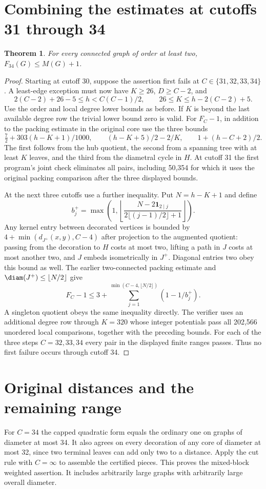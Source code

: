 \documentclass[11pt,a4paper]{article}
\newtheorem{theorem}{Theorem}[section]
\begin{document}
\section{Combining the estimates at cutoffs 31 through 34}
\begin{theorem}
For every connected graph of order at least two, $F_{34}(G)\le M(G)+1$.
\end{theorem}
\begin{proof}
Starting at cutoff 30, suppose the assertion first fails at $C\in\{31,32,33,34\}$. A least-edge exception must now have $K\ge26$, $D\ge C-2$, and
\[
2(C-2)+26-5\le h<C(C-1)/2,\qquad 26\le K\le h-2(C-2)+5 .
\]
Use the order and local degree lower bounds as before. If $K$ is beyond the last available degree row the trivial lower bound zero is valid. For $F_C-1$, in addition to the packing estimate in the original core use the three bounds
\[
 \tfrac72+303(h-K+1)/1000,\qquad (h-K+5)/2-2/K,\qquad 1+(h-C+2)/2.
\]
The first follows from the hub quotient, the second from a spanning tree with at least $K$ leaves, and the third from the diametral cycle in $H$. At cutoff 31 the first program's joint check eliminates all pairs, including 50,354 for which it uses the original packing comparison after the three displayed bounds.

At the next three cutoffs use a further inequality. Put $N=h-K+1$ and define
\[
 b_j^+=\max\left(1,\left\lfloor
 \frac{N-2\mathbf1_{2\mid j}}{2\lfloor(j-1)/2\rfloor+1}
 \right\rfloor\right).
\]
Any kernel entry between decorated vertices is bounded by $4+\min(d_{J^+}(x,y),C-4)$ after projection to the augmented quotient: passing from the decoration to $H$ costs at most two, lifting a path in $J$ costs at most another two, and $J$ embeds isometrically in $J^+$. Diagonal entries two obey this bound as well. The earlier two-connected packing estimate and $\diam(J^+)\le\lfloor N/2\rfloor$ give
\[
 F_C-1\le 3+\sum_{j=1}^{\min(C-4,\lfloor N/2\rfloor)}(1-1/b_j^+).
\]
A singleton quotient obeys the same inequality directly. The verifier uses an additional degree row through $K=320$ whose integer potentials pass all 202,566 unordered local comparisons, together with the preceding bounds. For each of the three steps $C=32,33,34$ every pair in the displayed finite ranges passes. Thus no first failure occurs through cutoff 34.
\end{proof}

\section{Original distances and the remaining range}
For $C=34$ the capped quadratic form equals the ordinary one on graphs of diameter at most 34. It also agrees on every decoration of any core of diameter at most 32, since two terminal leaves can add only two to a distance. Apply the cut rule with $C=\infty$ to assemble the certified pieces. This proves the mixed-block weighted assertion. It includes arbitrarily large graphs with arbitrarily large overall diameter.
\end{document}
